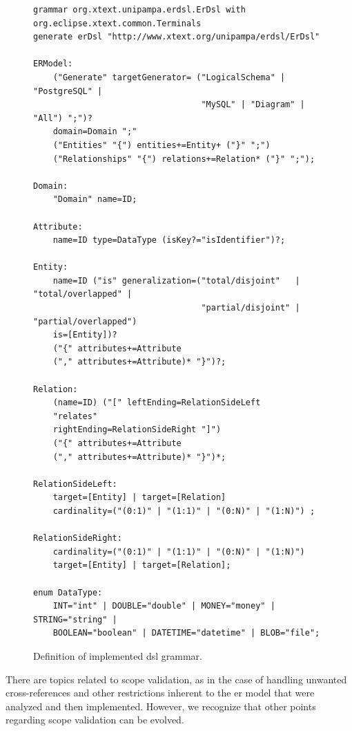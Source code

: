 
\lstset{basicstyle=\tiny}
\begin{figure} [!htb]
    \centering
    \caption{Definition of implemented \ac{dsl} grammar.}
    \label{fig:DSLvs1}
    \begin{scriptsize}
    \begin{lstlisting}[language = Xtext , frame = trbl]
grammar org.xtext.unipampa.erdsl.ErDsl with org.eclipse.xtext.common.Terminals
generate erDsl "http://www.xtext.org/unipampa/erdsl/ErDsl"

ERModel:
	("Generate" targetGenerator= ("LogicalSchema" | "PostgreSQL" | 
	                              "MySQL" | "Diagram" | "All") ";")?
	domain=Domain ";"
	("Entities" "{") entities+=Entity+ ("}" ";")
	("Relationships" "{") relations+=Relation* ("}" ";");

Domain:
	"Domain" name=ID;

Attribute:
	name=ID type=DataType (isKey?="isIdentifier")?;

Entity:
	name=ID ("is" generalization=("total/disjoint"   | "total/overlapped" |
	                              "partial/disjoint" | "partial/overlapped") 
	is=[Entity])?
	("{" attributes+=Attribute
	("," attributes+=Attribute)* "}")?;

Relation:
	(name=ID) ("[" leftEnding=RelationSideLeft
	"relates"
	rightEnding=RelationSideRight "]")
	("{" attributes+=Attribute
	("," attributes+=Attribute)* "}")*;

RelationSideLeft:
	target=[Entity] | target=[Relation]
	cardinality=("(0:1)" | "(1:1)" | "(0:N)" | "(1:N)") ;

RelationSideRight:
	cardinality=("(0:1)" | "(1:1)" | "(0:N)" | "(1:N)")
	target=[Entity] | target=[Relation];

enum DataType:
	INT="int" | DOUBLE="double" | MONEY="money" | STRING="string" |
	BOOLEAN="boolean" | DATETIME="datetime" | BLOB="file";
    \end{lstlisting}
    \end{scriptsize}    
\end{figure}

There are topics related to scope validation, as in the case of handling unwanted cross-references and other restrictions inherent to the \ac{er} model that were analyzed and then implemented.
However, we recognize that other points regarding scope validation can be evolved.

